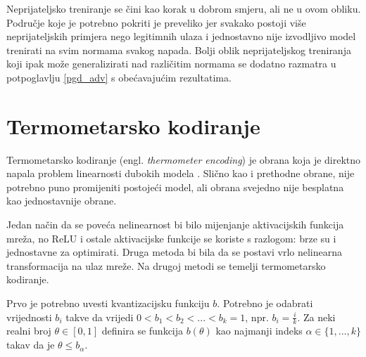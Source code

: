 \documentclass[utf8, diplomski]{fer}
\begin{document}
Neprijateljsko treniranje se čini kao korak u dobrom smjeru, ali ne u ovom obliku. Područje koje je potrebno pokriti je preveliko jer svakako postoji više neprijateljskih primjera nego legitimnih ulaza i jednostavno nije izvodljivo model trenirati na svim normama svakog napada. Bolji oblik neprijateljskog treniranja koji ipak može generalizirati nad različitim normama se dodatno razmatra u potpoglavlju \ref{pgd_adv} s obećavajućim rezultatima.

\section{Termometarsko kodiranje}\label{thermometer}
Termometarsko kodiranje (engl. \textit{thermometer encoding}) je obrana koja je direktno napala problem linearnosti dubokih modela \citep{thermometer_encoding}. Slično kao i prethodne obrane, nije potrebno puno promijeniti postojeći model, ali obrana svejedno nije besplatna kao jednostavnije obrane. \par
Jedan način da se poveća nelinearnost bi bilo mijenjanje aktivacijskih funkcija mreža, no ReLU i ostale aktivacijske funkcije se koriste s razlogom: brze su i jednostavne za optimirati. Druga metoda bi bila da se postavi vrlo nelinearna transformacija na ulaz mreže. Na drugoj metodi se temelji termometarsko kodiranje. \par
Prvo je potrebno uvesti kvantizacijsku funkciju $b$. Potrebno je odabrati vrijednosti $b_{i}$ takve da vrijedi $0 < b_{1} < b_{2} < ... < b_{k} = 1$, npr. $b_{i} = \frac{i}{k}$. Za neki realni broj $\theta \in [0, 1]$ definira se funkcija $b(\theta)$ kao najmanji indeks $\alpha \in \{1, ..., k\}$ takav da je $\theta \leq b_{\alpha}$. \\
\end{document}
